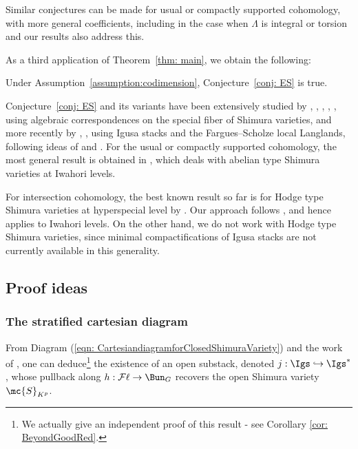 \documentclass[letterpaper,11pt]{amsart}
\begin{document}
\begin{remark}
Similar conjectures can be made for usual or compactly supported cohomology, with more general coefficients, including in the case when $\Lambda$ is integral or torsion and our results also address this.    
\end{remark}

As a third application of Theorem~\ref{thm: main}, we obtain the following:
\begin{theorem}\label{thm: ES intro}
    Under Assumption~\ref{assumption:codimension}, Conjecture~\ref{conj: ES} is true.
\end{theorem}

\begin{remark}
Conjecture~\ref{conj: ES} and its variants have been extensively studied by \cite{faltings-chai}, \cite{Wedhorn}, \cite{BueltelWedhorn}, \cite{Koskivirta}, \cite{Lee}, \cite{Wu} using algebraic correspondences on the special fiber of Shimura varieties, and more recently by \cite{DvHKZ}, \cite{vdHove}, \cite{DvHKZ2} using Igusa stacks and the Fargues--Scholze local Langlands, following ideas of \cite{XiaoZhu} and \cite{KoshikawaES}. For the usual or compactly supported cohomology, the most general result is obtained in \cite{DvHKZ2}, which deals with abelian type Shimura varieties at Iwahori levels. 

For intersection cohomology, the best known result so far is for Hodge type Shimura varieties at hyperspecial level by \cite{Wu}. Our approach follows \cite{DvHKZ}, and hence applies to Iwahori levels. On the other hand, we do not work with Hodge type Shimura varieties, since minimal compactifications of Igusa stacks are not currently available in this generality. 
\end{remark}

\subsection{Proof ideas}

\subsubsection{The stratified cartesian diagram}
From Diagram (\ref{eqn: CartesiandiagramforClosedShimuraVariety}) and the work of \cite[Theorem~D]{Kim}, one can deduce\footnote{We actually give an independent proof of this result - see Corollary \ref{cor: BeyondGoodRed}.} the existence of an open substack, denoted $j: \Igs \hookrightarrow \Igs^{*}$, whose pullback along $h: \mathcal{F}\ell\to \Bun_G$ recovers the open Shimura variety $\mc{S}_{K^p}$. 
\end{document}
